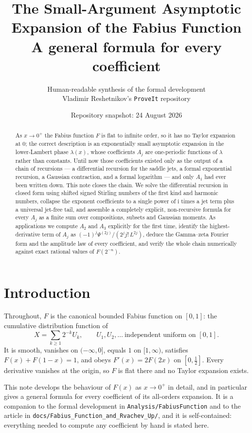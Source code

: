 \documentclass[11pt,oneside]{article}
\title{\bfseries The Small-Argument Asymptotic Expansion of the Fabius Function\\[0.35em]
\large A general formula for every coefficient}
\author{Human-readable synthesis of the formal development\\
\small Vladimir Reshetnikov's \texttt{ProveIt} repository}
\date{Repository snapshot: 24 August 2026}
\theoremstyle{definition}
\theoremstyle{remark}
\newcommand{\ii}{\mathrm i}
\newcommand{\repo}{\nolinkurl{Analysis/FabiusFunction}}
\begin{document}
\maketitle

\begin{abstract}
As $x\to0^+$ the Fabius function $F$ is flat to infinite order, so it has no
Taylor expansion at $0$; the correct description is an exponentially small
asymptotic expansion in the lower-Lambert phase $\lambda(x)$, whose
coefficients $A_j$ are one-periodic functions of $\lambda$ rather than
constants.  Until now those coefficients existed only as the output of a chain
of recursions --- a differential recursion for the saddle jets, a formal
exponential recursion, a Gaussian contraction, and a formal logarithm --- and
only $A_1$ had ever been written down.  This note closes the chain.  We solve
the differential recursion in closed form using shifted signed Stirling numbers
of the first kind and harmonic numbers, collapse the exponent coefficients to a single
power of $\ii$ times a jet term plus a universal jet-free tail, and assemble a
completely explicit, non-recursive formula for every $A_j$ as a finite sum over
compositions, subsets and Gaussian moments.  As applications we compute $A_2$
and $A_3$ explicitly for the first time, identify the highest-derivative term
of $A_j$ as $(-1)^j\Psi^{(2j)}/(2^jj!\,L^{2j})$, deduce the
Gamma--zeta Fourier form and the amplitude law of every coefficient, and verify
the whole chain numerically against exact rational values of $F(2^{-n})$.
\end{abstract}

\tableofcontents

\section{Introduction}

Throughout, $F$ is the canonical bounded Fabius function on $[0,1]$: the
cumulative distribution function of
\[
  X=\sum_{k\ge1}2^{-k}U_k,\qquad U_1,U_2,\dots\ \text{independent uniform on }[0,1].
\]
It is smooth, vanishes on $(-\infty,0]$, equals $1$ on $[1,\infty)$, satisfies
$F(x)+F(1-x)=1$, and obeys $F'(x)=2F(2x)$ on $[0,\tfrac12]$.  Every derivative
vanishes at the origin, so $F$ is flat there and no Taylor expansion exists.

This note develops the behaviour of $F(x)$ as $x\to0^+$ in detail, and in
particular gives a general formula for every coefficient of its all-orders
expansion.  It is a companion to the formal development in \repo{} and to the
article in \nolinkurl{docs/Fabius_Function_and_Rvachev_Up/}, and it is
self-contained: everything needed to compute any coefficient by hand is stated
here.
\end{document}
